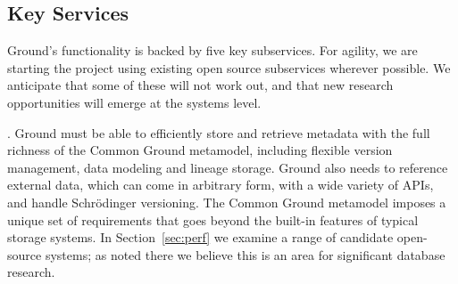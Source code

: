 \documentclass{sig-alternate}
\begin{document}


\subsection{Key Services}
Ground's functionality is backed by five key subservices.  For agility, we are starting the project using existing open source subservices wherever possible.  We anticipate that some of these will not work out, and that new research opportunities will emerge at the systems level.

.  Ground must be able to efficiently store and retrieve metadata with the full richness of the Common Ground metamodel, including flexible version management, data modeling and lineage storage.  Ground also needs to reference external data, which can come in arbitrary form, with a wide variety of APIs, and handle Schr\"{o}dinger versioning.  The Common Ground metamodel imposes a unique set of requirements that goes beyond the built-in features of typical storage systems. In Section~\ref{sec:perf} we examine a range of candidate open-source systems; as noted there we believe this is an area for significant database research.


\end{document}
